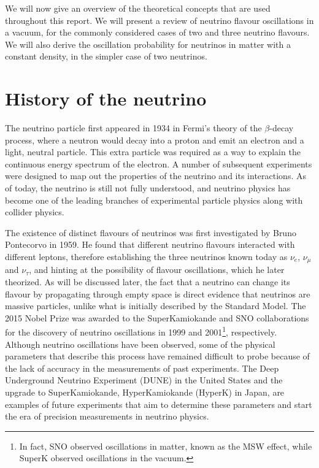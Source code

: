 \label{ch:osc}
We will now give an overview of the theoretical concepts that are used
throughout this report. We will present a review of neutrino flavour
oscillations in a vacuum, for the commonly considered cases of two and three
neutrino flavours. We will also derive the oscillation probability for
neutrinos in matter with a constant density, in the simpler case of two
neutrinos. 


\section{History of the neutrino}
The neutrino particle first appeared in 1934 in Fermi's theory of the $\beta$-decay
process\cite{fermi}, where a neutron would decay into a proton and emit an electron and a
light, neutral particle. This extra particle was required as a way to explain the
continuous energy spectrum of the electron. A number of subsequent experiments
were designed to map out the properties of the neutrino and its
interactions\cite{zuber}. As of today, the neutrino is still not fully
understood, and neutrino physics has become one of the leading branches of
experimental particle physics along with collider physics. 

The existence of distinct flavours of neutrinos was first investigated by
Bruno Pontecorvo in 1959\cite{pontecorvo}. He found that different neutrino flavours
interacted with different leptons, therefore establishing the three neutrinos
known today as $\nu_e$, $\nu_\mu$ and $\nu_\tau$, and hinting at the
possibility of flavour oscillations, which he later theorized.
As will be discussed later, the fact that a neutrino can change its flavour by
propagating through empty space is direct evidence that neutrinos are massive
particles, unlike what is initially described by the Standard Model.
The 2015 Nobel Prize was awarded to the SuperKamiokande and SNO collaborations
for the discovery of neutrino oscillations in 1999 and 2001\footnote{In fact,
SNO observed oscillations in matter, known as the MSW effect\cite{smirnov},
while SuperK observed oscillations in the vacuum.}, respectively.
Although neutrino oscillations have been observed, some of the physical parameters that
describe this process have remained difficult to probe because of the lack of
accuracy in the measurements of past experiments. 
The Deep Underground Neutrino Experiment (DUNE) in the United States and the
upgrade to SuperKamiokande, HyperKamiokande (HyperK) in Japan, are examples of
future experiments that aim to determine these parameters and start the era of
precision measurements in neutrino physics.


